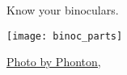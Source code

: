 \documentclass[t,handout]{beamer}  %
\begin{document}
{
\begin{frame}[t,plain]{Know your binoculars.}

\texttt{[image: binoc\_parts]}

\end{frame}
}


{
\begin{frame}

\vfilll

\tinyfill \href{https://www.flickr.com/photos/36436392@N05/3373117530}{Photo by Phonton, }
\end{frame}
}
\end{document}
